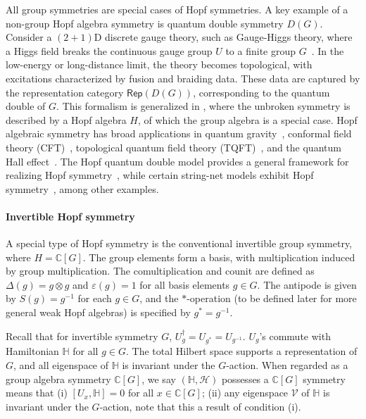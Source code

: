 \documentclass[a4paper,11pt]{article}
\theoremstyle{theorem}
\theoremstyle{remark}
\newcommand{\Cbb}{\mathbb{C}}
\begin{document}
All group symmetries are special cases of Hopf symmetries. A key example of a non-group Hopf algebra symmetry is quantum double symmetry $D(G)$.
Consider a $(2+1)$D discrete gauge theory, such as Gauge-Higgs theory, where a Higgs field breaks the continuous gauge group $U$ to a finite group $G$~\cite{Propitius1995, bais1992quantum}. In the low-energy or long-distance limit, the theory becomes topological, with excitations characterized by fusion and braiding data. These data are captured by the representation category $\mathsf{Rep}(D(G))$, corresponding to the quantum double of $G$.
This formalism is generalized in \cite{bais2003hopf}, where the unbroken symmetry is described by a Hopf algebra $H$, of which the group algebra is a special case. 
Hopf algebraic symmetry has broad applications in quantum gravity~\cite{Bais2002quantum, majid2000foundations, delcamp2017fusion}, conformal field theory (CFT)~\cite{fuchs1995affine}, topological quantum field theory (TQFT)~\cite{meusburger2021hopf, meusburger2017kitaev}, and the quantum Hall effect~\cite{Slingerland2001quantum}. 
The Hopf quantum double model provides a general framework for realizing Hopf symmetry~\cite{Kitaev2003, Buerschaper2013a, buerschaper2013electric, meusburger2017kitaev, meusburger2021hopf, koppen2020defects, girelli2021semidual, voss2021defects, chen2021ribbon, jia2023boundary}, while certain string-net models exhibit Hopf symmetry~\cite{Kitaev2012boundary, jia2024weakTube}, among other examples.



\paragraph{Invertible Hopf symmetry} 
A special type of Hopf symmetry is the conventional invertible group symmetry, where \( H = \mathbb{C}[G] \). The group elements form a basis, with multiplication induced by group multiplication. The comultiplication and counit are defined as \( \Delta(g) = g \otimes g \) and \( \varepsilon(g) = 1 \) for all basis elements \( g \in G \). The antipode is given by \( S(g) = g^{-1} \) for each \( g \in G \), and the \( * \)-operation (to be defined later for more general weak Hopf algebras) is specified by \( g^* = g^{-1}\).


Recall that for invertible symmetry $G$, $U_g^{\dagger}=U_{g^*}=U_{g^{-1}}$. $U_g$'s commute with Hamiltonian $\mathbb{H}$ for all $g\in G$. The total Hilbert space supports a representation of $G$, and all eigenspace of $\mathbb{H}$ is invariant under the $G$-action. When regarded as a group algebra symmetry $\Cbb[G]$, we say $(\mathbb{H}, \mathcal{H})$ possesses a $\Cbb[G]$ symmetry means that (i) $[U_x, \mathbb{H}]=0$ for all $x\in \Cbb[G]$; (ii) any eigenspace $\mathcal{V}$ of $\mathbb{H}$ is invariant under the $G$-action, note that this a result of condition (i).
\end{document}
